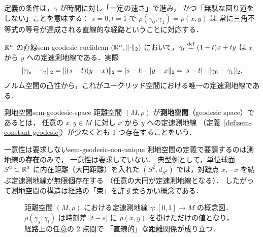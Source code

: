定義の条件は，$\gamma$ が時間に対し「一定の速さ」で進み，
かつ「無駄な回り道をしない」ことを意味する：
$s = 0, t = 1$ で $\rho(\gamma_0, \gamma_1) = \rho(x, y)$ は
常に三角不等式の等号が達成される直線的な経路ということに対応する．

\begin{example}{$\mathbb{R}^n$ の直線}{sem-geodesic-euclidean}
  $(\mathbb{R}^n, \lVert \cdot \rVert_2)$ において，$\gamma_t \overset{\mathrm{def}}{=} (1 - t) x + t y$ は
  $x$ から $y$ への定速測地線である．実際
  \[
    \lVert \gamma_s - \gamma_t \rVert_2
    = \lVert (s - t)(y - x) \rVert_2
    = |s - t| \cdot \lVert y - x \rVert_2
    = |s - t| \cdot \lVert \gamma_0 - \gamma_1 \rVert_2.
  \]
  ノルム空間の凸性から，これがユークリッド空間における唯一の定速測地線である．
\end{example}

\begin{definition}{測地空間}{sem-geodesic-space}
  距離空間 $(M, \rho)$ が\textbf{測地空間}（geodesic space）であるとは，
  任意の $x, y \in M$ に対し $x$ から $y$ への定速測地線
  （定義~\ref{def:sem-constant-geodesic}）が少なくとも 1 つ存在することをいう．
\end{definition}

\begin{remark}{一意性は要求しない}{sem-geodesic-non-unique}
  測地空間の定義で要請するのは測地線の\textbf{存在}のみで，
  一意性は要求していない．
  典型例として，単位球面 $S^2 \subset \mathbb{R}^3$ に内在距離（大円距離）を入れた
  $(S^2, d_{S^2})$ では，対蹠点 $x, -x$ を結ぶ定速測地線が無限個存在する
  （任意の大円が定速測地線となる）．
  したがって測地空間の構造は経路の「束」を許す柔らかい概念である．
\end{remark}

\begin{figure}[H]
\centering
{}
\caption{距離空間 $(M, \rho)$ における定速測地線 $\gamma \colon [0, 1] \to M$
の概念図．$\rho(\gamma_s, \gamma_t)$ は時刻差 $|t - s|$ に
$\rho(x, y)$ を掛けただけの値となり，経路上の任意の 2 点間で
「直線的」な距離関係が成り立つ．}
\label{fig:sem-constant-geodesic}
\end{figure}

